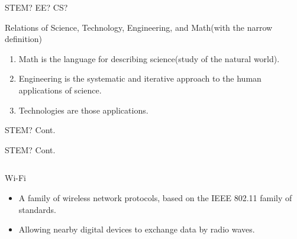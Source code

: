 \documentclass[aspectratio=169, 12pt]{beamer}
\begin{document}
\begin{frame}{STEM? EE? CS?}
\begin{alertblock}{Relations of Science, Technology, Engineering, and Math(with the narrow definition)}
\begin{enumerate}
\item Math is the language for describing science(study of the natural world).
\item Engineering is the systematic and iterative approach to the human applications of science.
\item Technologies are those applications.
\end{enumerate}
\end{alertblock}
\end{frame}

\begin{frame}{STEM? Cont.}
\centering
{}
\end{frame}

\begin{frame}{STEM? Cont.}
    \begin{columns}
            \centering
            \begin{block}{Wi-Fi}
            \begin{itemize}
            \item A family of wireless network protocols, based on the IEEE 802.11 family of standards.
            \item Allowing nearby digital devices to exchange data by radio waves.
            \end{itemize}

            \end{block}
    \end{columns}
\end{frame}
\end{document}
